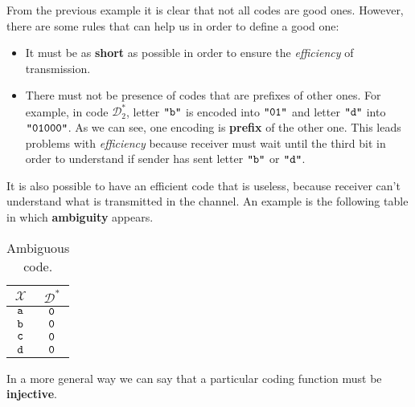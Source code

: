 From the previous example it is clear that not all codes are good ones. However, there are some rules that can help us in order to define a good one:
\begin{itemize}
	\item It must be as \textbf{short} as possible in order to ensure the \textit{efficiency} of transmission.
	\item There must not be presence of codes that are prefixes of other ones. For example, in code $\mathcal{D}^*_2$, letter $\verb|"b"|$ is encoded into $\verb|"01"|$ and letter $\verb|"d"|$ into $\verb|"01000"|$. As we can see, one encoding is \textbf{prefix} of the other one. This leads problems with \textit{efficiency} because receiver must wait until the third bit in order to understand if sender has sent letter $\verb|"b"|$ or $\verb|"d"|$.
\end{itemize}  
It is also possible to have an efficient code that is useless, because receiver can't understand what is transmitted in the channel. An example is the following table in which \textbf{ambiguity} appears.
\begin{table}[H]
	\centering
	\begin{tabular}{| c | c |}
		\hline
		$\mathcal{X}$ & $\mathcal{D}^*$\\\hline
		$\verb|a|$ & $\verb|0|$ \\
		$\verb|b|$ & $\verb|0|$ \\
		$\verb|c|$ & $\verb|0|$ \\
		$\verb|d|$ & $\verb|0|$ \\
		\hline
	\end{tabular}
	\caption{Ambiguous code.}
\end{table}
\par
In a more general way we can say that a particular coding function must be \textbf{injective}.

